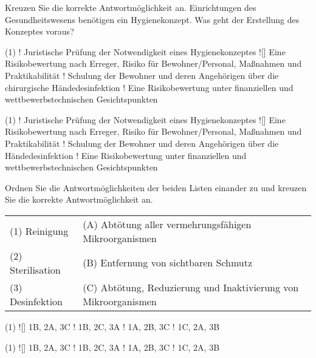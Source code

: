 \documentclass[a4paper]{scrartcl}
\begin{document}
\begin{aufgabe}{1}
	Kreuzen Sie die korrekte Antwortmöglichkeit an. Einrichtungen des Gesundheitswesens benötigen ein Hygienekonzept. Was geht der Erstellung des Konzeptes voraus?
	\begin{center}
		\begin{mcumgebung}(1)
			\choice! Juristische Prüfung der Notwendigkeit eines Hygienekonzeptes
			\choice![\mcrichtig] Eine Risikobewertung nach Erreger, Risiko für Bewohner/Personal, Maßnahmen und Praktikabilität
			\choice! Schulung der Bewohner und deren Angehörigen über die chirurgische Händedesinfektion
			\choice! Eine Risikobewertung unter finanziellen und wettbewerbstechnischen Gesichtspunkten
		\end{mcumgebung}
	\end{center}
	
	\begin{loesung}
		\begin{mcumgebung}(1)
			\choice! Juristische Prüfung der Notwendigkeit eines Hygienekonzeptes
			\choice![\mcrichtig] Eine Risikobewertung nach Erreger, Risiko für Bewohner/Personal, Maßnahmen und Praktikabilität
			\choice! Schulung der Bewohner und deren Angehörigen über die Händedesinfektion
			\choice! Eine Risikobewertung unter finanziellen und wettbewerbstechnischen Gesichtspunkten
		\end{mcumgebung}
	\end{loesung}
\end{aufgabe}



\begin{aufgabe}{2}
	Ordnen Sie die Antwortmöglichkeiten der beiden Listen einander zu und kreuzen Sie die korrekte Antwortmöglichkeit an.
	
	\vspace{1em}
	\begin{tabular}{ll}
		(1) Reinigung  & (A) Abtötung aller vermehrungsfähigen Mikroorganismen\\
		(2) Sterilisation & (B) Entfernung von sichtbaren Schmutz\\
		(3) Desinfektion & (C) Abtötung, Reduzierung und Inaktivierung von Mikroorganismen \\
	\end{tabular}
	
	
	\begin{mcumgebung}(1)
		\choice![\mcrichtig] 1B, 2A, 3C
		\choice! 1B, 2C, 3A
		\choice! 1A, 2B, 3C
		\choice! 1C, 2A, 3B
	\end{mcumgebung}
	
	\begin{loesung}
		\begin{mcumgebung}(1)
			\choice![\mcrichtig] 1B, 2A, 3C
			\choice! 1B, 2C, 3A
			\choice! 1A, 2B, 3C
			\choice! 1C, 2A, 3B
		\end{mcumgebung}
	\end{loesung}
\end{aufgabe}
\end{document}
